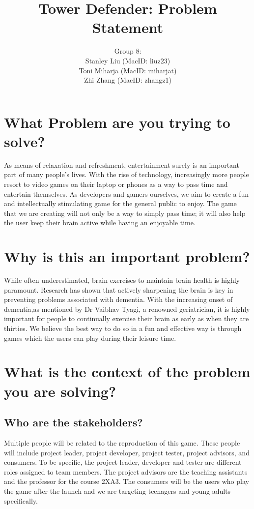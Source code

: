 \documentclass[12pt]{article}
\title{Tower Defender: Problem Statement}
\author{Group 8: \\
                 Stanley Liu (MacID: liuz23) \\    
                 Toni Miharja (MacID: miharjat)\\
                 Zhi Zhang (MacID: zhangz1)}
\begin{document}
\maketitle

\section {What Problem are you trying to solve?}
As means of relaxation and refreshment, entertainment surely is an important part of many people’s lives. With the rise of technology, increasingly more people resort to video games on their laptop or phones as a way to pass time and entertain themselves. As developers and gamers ourselves, we aim to create a fun and intellectually stimulating game for the general public to enjoy. The game that we are creating will not only be a way to simply pass time; it will also help the user keep their brain active while having an enjoyable time. 

\section {Why is this an important problem?}
While often underestimated, brain exercises to maintain brain health is highly paramount. Research has shown that actively sharpening the brain is key in preventing problems associated with dementia. With the increasing onset of dementia,as mentioned by Dr Vaibhav Tyagi, a renowned geriatrician, it is highly important for people to continually exercise their brain as early as when they are thirties. We believe the best way to do so in a fun and effective way is through games which the users can play during their leisure time.

\section {What is the context of the problem you are solving?}
    \subsection {Who are the stakeholders?}
    Multiple people will be related to the reproduction of this game. These people will include project leader, project developer, project tester, project advisors, and consumers. To be specific, the project leader, developer and tester are different roles assigned to team members. The project advisors are the teaching assistants and the professor for the course 2XA3. The consumers will be the users who play the game after the launch and we are targeting teenagers and young adults specifically. 
\end{document}
